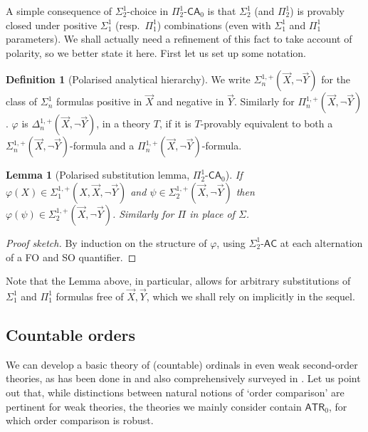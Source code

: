 \documentclass[10pt,a4paper]{amsart}
\theoremstyle{plain}
\newtheorem{lemma}[lemma]{Lemma}
\theoremstyle{definition}
\newtheorem{definition}[definition]{Definition}
\renewcommand{\phi}{\varphi}
\theoremstyle{plain}
\theoremstyle{definition} %
\newcommand{\Sin}[2]{\Sigma^{#1}_{#2}}
\newcommand{\Pin}[2]{\Pi^{#1}_{#2}}
\newcommand{\Din}[2]{\Delta^{#1}_{#2}}
\newcommand{\posSin}[3]{\Sin{#1,+}{#2} (#3)}
\newcommand{\posPin}[3]{\Pin{#1,+}{#2} (#3)}
\newcommand{\posDin}[3]{\Din{#1,+}{#2} (#3)}
\newcommand{\posnegSin}[4]{\posSin{#1}{#2}{#3, \lnot #4}}
\newcommand{\posnegPin}[4]{\posPin{#1}{#2}{#3, \lnot #4}}
\newcommand{\posnegDin}[4]{\posDin{#1}{#2}{#3, \lnot #4}}
\newcommand{\CA}{\mathsf{CA}}
\newcommand{\AC}{\mathsf{AC}}
\newcommand{\ca}[1]{#1\text{-}\CA}
\newcommand{\ac}[1]{#1\text{-}\AC}
\newcommand{\PSCA}{\ca{\Pin 1 2 }_0}
\newcommand{\ATR}{\mathsf{ATR}}
\newcommand{\WO}{\mathrm{WO}}
\newcommand{\ordleq}{\preceq}
\begin{document}
A simple consequence of $\Sin 1 2$-choice in $\PSCA$ is that $\Sin 1 2$ (and $\Pin 1 2 $) is provably closed under positive $\Sin 1 1 $ (resp.\ $\Pin 1 1 $) combinations (even with $\Sin 1 1 $ and $\Pin 1 1 $ parameters).
We shall actually need a refinement of this fact to take account of polarity, so we better state it here.
First let us set up some notation.


\begin{definition}
    [Polarised analytical hierarchy]
    We write $\posnegSin 1 n {\vec X}{\vec Y}$ for the class of $\Sin 1 n $ formulas positive in $\vec X$ and negative in $\vec Y$.
Similarly for $\posnegPin 1 n {\vec X}{\vec Y}$.
$\phi$ is $\posnegDin 1 n {\vec X}{\vec Y}$, in a theory $T$, if it is $T$-provably equivalent to both a $\posnegSin 1 n {\vec X}{\vec Y} $-formula and a $\posnegPin 1 n{\vec X}{\vec Y}$-formula.
\end{definition}

\begin{lemma}
[Polarised substitution lemma, $\PSCA$]
\label{lem:pol-sub}
If $\phi(X) \in \posnegSin 1 1 {X,\vec X}{\vec Y}$ and $\psi\in \posnegSin 1 2 {\vec X}{\vec Y}$ then $\phi(\psi) \in \posnegSin 1 2 {\vec X}{\vec Y}$.
Similarly for $\Pi$ in place of $\Sigma$.
\end{lemma}
\begin{proof}
    [Proof sketch]
    By induction on the structure of $\phi$, using $\ac{\Sin 1 2}$ at each alternation of a FO and SO quantifier.
\end{proof}

Note that the Lemma above, in particular, allows for arbitrary substitutions of $\Sin 1 1 $ and $\Pin 1 1 $ formulas free of $\vec X,\vec Y$, which we shall rely on implicitly in the sequel.






\subsection{Countable orders}
We can develop a basic theory of (countable) ordinals in even weak second-order theories, as has been done in \cite{Simpson99:monograph} and also comprehensively surveyed in \cite{hirst05:ord-arith-rm-survey}.
Let us point out that, while distinctions between natural notions of `order comparison' are pertinent for weak theories, the theories we mainly consider contain $\ATR_0$, for which order comparison is robust.
\end{document}
